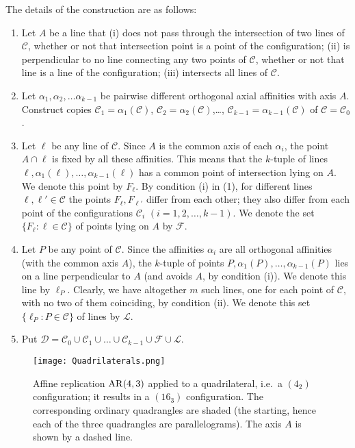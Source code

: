 \documentclass[reqno,12pt]{amsart}
\theoremstyle{plain}
\theoremstyle{definition}
\theoremstyle{remark}
\newcommand{\be}{\begin{enumerate}}
\newcommand{\ee}{\end{enumerate}}
\newcommand{\mc}[1]{\mathcal{#1}}
\begin{document}
The details of the construction are as follows:

\be

\item Let $A$ be a line that (i) does not pass through the intersection of two lines of $\mc{C}$, whether or not that intersection point 
is a point of the configuration; (ii) is perpendicular to no line connecting any two points of $\mc{C}$, whether or not that line is a line 
of the configuration; (iii) intersects all lines of $\mc{C}$.

\item 
Let $\alpha_{1}, \alpha_{2}, \ldots \alpha_{k-1}$ be pairwise different orthogonal axial affinities with axis $A$. 
Construct copies $\mc{C}_{1} = \alpha_{1}(\mc{C})$, $\mc{C}_{2} = \alpha_{2}(\mc{C})$,\ldots, 
$\mc{C}_{k-1} = \alpha_{k-1}(\mc{C})$ of $\mc{\mc{C}} = \mc{C}_{0}$.

\item 
Let $\ell$ be any line of $\mc{C}$. Since $A$ is the common axis of each $\alpha_i$, the point $A\cap \ell$ is fixed by all these affinities.
This means that the $k$-tuple of lines $\ell, \alpha_{1}(\ell), \ldots, \alpha_{k-1}(\ell)$ has a common point of intersection
lying on $A$. We denote this point by $F_{\ell}$. By condition (i) in (1), for different lines $\ell, \ell' \in \mc {C}$ the points 
$F_{\ell}, F_{\ell'}$ differ from each other; they also differ from each point of the configurations $\mc {C}_i $ $(i=1,2,\dots, k-1)$.  
We denote the set $\{F_{\ell}: \ell\in \mc{C}\}$ of points lying on $A$ by $\mc{F}$.

\item
Let $P$ be any point of $\mc{C}$. Since the affinities $\alpha_{i}$ are all orthogonal affinities (with the common axis $A$), 
the $k$-tuple of points $P, \alpha_{1}(P), \dots, \alpha_{k-1}(P)$ lies on a line perpendicular to $A$ (and avoids $A$, by condition (i)).
We denote this line by $\ell_P$. Clearly, we have altogether $m$ such lines, one for each point of $\mc{C}$, with no two of them coinciding, by condition (ii).
We denote this set $\{\ell_P: P\in \mc{C}\}$ of lines by $\mc L$.

\item
Put $\mc{D} = \mc{C}_0\cup \mc{C}_{1}\cup\dots \cup\mc{C}_{k-1}\cup \mc{F} \cup \mc L$.

\ee
\begin{figure}[h]
\begin{center}
\texttt{[image: Quadrilaterals.png]}
\caption{Affine replication $\mathrm{AR}(4, 3)$ applied to a quadrilateral, i.e.\ a $(4_2)$ configuration;
it results in a $(16_3)$ configuration. The corresponding ordinary quadrangles are shaded (the starting, 
hence each of the three quadrangles are parallelograms). The axis $A$ is shown by a dashed line.}
\label{fig:Quadrilaterals}
\end{center}
\end{figure}
\end{document}
